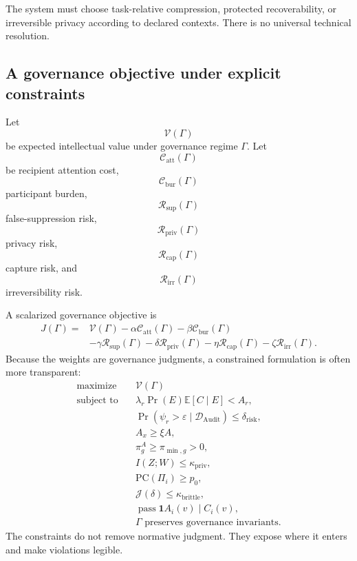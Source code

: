 \documentclass[11pt]{article}
\theoremstyle{definition}
\DeclareMathOperator{\Audit}{Audit}
\DeclareMathOperator{\Prob}{Pr}
\newcommand{\E}{\mathbb{E}}
\newcommand{\ind}{\mathbf{1}}
\newcommand{\eps}{\varepsilon}
\begin{document}
The system must choose task-relative compression, protected recoverability, or irreversible privacy according to declared contexts. There is no universal technical resolution.

\subsection{A governance objective under explicit constraints}

Let
\[
\mathcal{V}(\Gamma)
\]
be expected intellectual value under governance regime \(\Gamma\). Let
\[
\mathcal{C}_{\mathrm{att}}(\Gamma)
\]
be recipient attention cost,
\[
\mathcal{C}_{\mathrm{bur}}(\Gamma)
\]
participant burden,
\[
\mathcal{R}_{\mathrm{sup}}(\Gamma)
\]
false-suppression risk,
\[
\mathcal{R}_{\mathrm{priv}}(\Gamma)
\]
privacy risk,
\[
\mathcal{R}_{\mathrm{cap}}(\Gamma)
\]
capture risk, and
\[
\mathcal{R}_{\mathrm{irr}}(\Gamma)
\]
irreversibility risk.

A scalarized governance objective is
\[
\begin{aligned}
J(\Gamma)
={}&
\mathcal{V}(\Gamma)
-
\alpha\mathcal{C}_{\mathrm{att}}(\Gamma)
-
\beta\mathcal{C}_{\mathrm{bur}}(\Gamma)
\\
&
-
\gamma\mathcal{R}_{\mathrm{sup}}(\Gamma)
-
\delta\mathcal{R}_{\mathrm{priv}}(\Gamma)
-
\eta\mathcal{R}_{\mathrm{cap}}(\Gamma)
-
\zeta\mathcal{R}_{\mathrm{irr}}(\Gamma).
\end{aligned}
\]
Because the weights are governance judgments, a constrained formulation is often more transparent:
\[
\begin{aligned}
\text{maximize}\quad&
\mathcal{V}(\Gamma)
\\
\text{subject to}\quad&
\lambda_r\Prob(E)\E[C\mid E]<A_r,
\\
&
\Prob(
\psi_r>\eps
\mid
\mathcal{D}_{\Audit}
)
\leq\delta_{\mathrm{risk}},
\\
&
A_x\geq\xi A,
\\
&
\pi_g^{A}\geq\pi_{\min,g}>0,
\\
&
I(Z;W)\leq\kappa_{\mathrm{priv}},
\\
&
\mathrm{PC}(\Pi_i)\geq p_0,
\\
&
\mathcal{J}(\delta)\leq\kappa_{\mathrm{brittle}},
\\
&
\operatorname{pass}\ind A_i(v)\mid C_i(v),
\\
&
\Gamma\text{ preserves governance invariants}.
\end{aligned}
\]
The constraints do not remove normative judgment. They expose where it enters and make violations legible.
\end{document}
